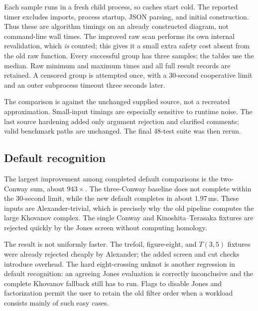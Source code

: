 \documentclass[11pt,a4paper]{article}
\theoremstyle{definition}\newtheorem{remark}[theorem]{Remark}
\begin{document}
Each sample runs in a fresh child process, so caches start cold. The reported
timer excludes imports, process startup, JSON parsing, and initial
 construction. Thus these are algorithm timings on an already
constructed diagram, not command-line wall times. The improved raw scan performs
its own internal revalidation, which \emph{is} counted; this gives it a small
extra safety cost absent from the old raw function. Every successful group has
three samples; the tables use the median. Raw minimum and maximum times and all
full result records are retained. A censored group is attempted once, with a
30-second cooperative limit and an outer subprocess timeout three seconds later.

The comparison is against the unchanged supplied source, not a recreated
approximation. Small-input timings are especially sensitive to runtime noise.
The last source hardening added only argument rejection and clarified comments;
valid benchmark paths are unchanged. The final 48-test suite was then rerun.

\subsection{Default recognition}
\begin{table}[htbp]
\centering\small

\caption{Default recognition, cold-process medians. Ratio is baseline time
 divided by improved time; ratios below one are regressions. The $>$ marker
 denotes a censored baseline, not a measured completion time.}
\label{tab:recognition}
\end{table}

The largest improvement among completed default comparisons is the two-Conway
sum, about $943\times$. The three-Conway baseline does not complete within the
30-second limit, while the new default completes in about 1.97\,ms. These
inputs are Alexander-trivial, which is precisely why the old pipeline computes
the large Khovanov complex. The single Conway and Kinoshita--Terasaka fixtures
are rejected quickly by the Jones screen without computing homology.

The result is not uniformly faster. The trefoil, figure-eight, and $T(3,5)$
fixtures were already rejected cheaply by Alexander; the added screen and cut
checks introduce overhead. The hard eight-crossing unknot is another regression
in default recognition: an agreeing Jones evaluation is correctly inconclusive
and the complete Khovanov fallback still has to run. Flags to disable Jones and
factorization permit the user to retain the old filter order when a workload
consists mainly of such easy cases.
\end{document}
